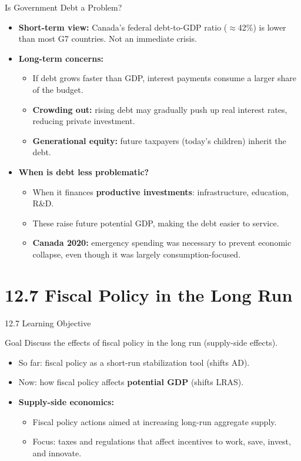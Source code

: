 \documentclass[aspectratio=169]{beamer}
\begin{document}
\begin{frame}{Is Government Debt a Problem?}
\transfade
\begin{itemize}
  \item \textbf{Short-term view:} Canada's federal debt-to-GDP ratio ($\approx$42\%) is lower than most G7 countries. Not an immediate crisis.
  \item \textbf{Long-term concerns:}
  \begin{itemize}
    \item If debt grows faster than GDP, interest payments consume a larger share of the budget.
    \item \textbf{Crowding out:} rising debt may gradually push up real interest rates, reducing private investment.
    \item \textbf{Generational equity:} future taxpayers (today's children) inherit the debt.
  \end{itemize}
  \item \textbf{When is debt less problematic?}
  \begin{itemize}
    \item When it finances \textbf{productive investments}: infrastructure, education, R\&D.
    \item These raise future potential GDP, making the debt easier to service.
    \item \textbf{Canada 2020:} emergency spending was necessary to prevent economic collapse, even though it was largely consumption-focused.
  \end{itemize}
\end{itemize}
\end{frame}

\section{12.7 Fiscal Policy in the Long Run}

\begin{frame}{12.7 Learning Objective}
\transfade
\begin{block}{Goal}
Discuss the effects of fiscal policy in the long run (supply-side effects).
\end{block}
\begin{itemize}
  \item So far: fiscal policy as a short-run stabilization tool (shifts AD).
  \item Now: how fiscal policy affects \textbf{potential GDP} (shifts LRAS).
  \item \textbf{Supply-side economics:}
  \begin{itemize}
    \item Fiscal policy actions aimed at increasing long-run aggregate supply.
    \item Focus: taxes and regulations that affect incentives to work, save, invest, and innovate.
  \end{itemize}
\end{itemize}
\end{frame}
\end{document}
